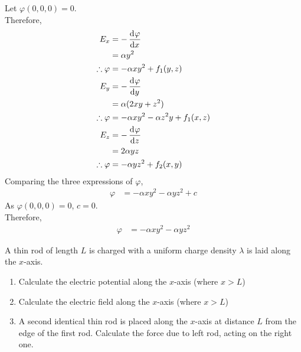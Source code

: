 \documentclass[fleqn, a4paper, 12pt, twoside]{article}
\theoremstyle{definition}
\theoremstyle{theorem}
\begin{document}
\begin{solution}
	Let $\varphi(0,0,0) = 0$.\\
	Therefore,
	\begin{align*}
		E_x &= -\dod{\varphi}{x}\\
		&= \alpha y^2\\
		\therefore \varphi &= -\alpha x y^2 + f_1(y,z)\\
		E_y &= -\dod{\varphi}{y}\\
		&= \alpha (2 x y + z^2)\\
		\therefore \varphi &= -\alpha x y^2 - \alpha z^2 y + f_1(x,z)\\
		E_z &= -\dod{\varphi}{z}\\
		&= 2 \alpha y z\\
		\therefore \varphi &= -\alpha y z^2 + f_2(x,y)
	\end{align*}
	Comparing the three expressions of $\varphi$,
	\begin{align*}
		\varphi &= -\alpha x y^2 - \alpha y z^2 + c
	\end{align*}
	As $\varphi(0,0,0) = 0$, $c = 0$.\\
	Therefore,
	\begin{align*}
		\varphi &= -\alpha x y^2 - \alpha y z^2
	\end{align*}
\end{solution}

\begin{question}
	A thin rod of length $L$ is charged with a uniform charge density $\lambda$ is laid along the $x$-axis.
	\begin{enumerate}
		\item
			Calculate the electric potential along the $x$-axis (where $x > L$)
		\item
			Calculate the electric field along the $x$-axis (where $x > L$)
		\item
			A second identical thin rod is placed along the $x$-axis at distance $L$ from the edge of the first rod.
			Calculate the force due to left rod, acting on the right one.
	\end{enumerate}
\end{question}
\end{document}
